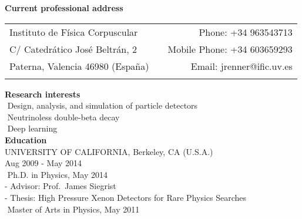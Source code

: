 \vspace{0.5cm}
{\noindent\textbf{Current professional address}}

\begin{tabular*}{\textwidth}{lcr}
Instituto de F\'isica Corpuscular & \hspace{1.2in} & Phone: +34 963543713\\
C/ Catedr\'atico Jos\'e Beltr\'an, 2 & & Mobile Phone: +34 603659293\\
Paterna, Valencia 46980 (Espa\~na) & & Email: jrenner@ific.uv.es\\
&&\\
\end{tabular*}

{\noindent\textbf{Research interests}}\\

\indent\hspace{0.2 cm}\textbullet\,\,Design, analysis, and simulation of particle detectors\\
\indent\hspace{0.2 cm}\textbullet\,\,Neutrinoless double-beta decay\\
\indent\hspace{0.2 cm}\textbullet\,\,Deep learning\\

{\noindent\textbf{Education}}\\

\indent\hspace{0.2 cm}UNIVERSITY OF CALIFORNIA, Berkeley, CA (U.S.A.)\\ 
\indent\hspace{0.2 cm}Aug 2009 - May 2014\\
\indent\hspace{0.2 cm}\hspace{0.6 cm}\textbullet\,\,Ph.D. in Physics, May 2014\\ %
\indent\hspace{0.2 cm}\hspace{1.2 cm}-\,\,Advisor: Prof.\ James Siegrist\\
\indent\hspace{0.2 cm}\hspace{1.2 cm}-\,\,Thesis: High Pressure Xenon Detectors for Rare Physics Searches\\
\indent\hspace{0.2 cm}\hspace{0.6 cm}\textbullet\,\,Master of Arts in Physics, May 2011\\

